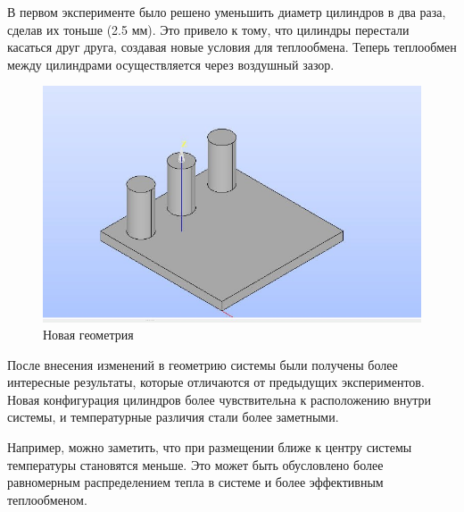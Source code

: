 \documentclass[a4paper,12pt]{article}
\theoremstyle{plain} %
\theoremstyle{definition} %
\theoremstyle{remark} %
\begin{document}
В первом эксперименте было решено уменьшить диаметр цилиндров в два раза, сделав их тоньше (2.5 мм). Это привело к тому, что цилиндры перестали касаться друг друга, создавая новые условия для теплообмена. Теперь теплообмен между цилиндрами осуществляется через воздушный зазор.

\begin{figure}[h]
	\begin{center}
		\includegraphics[width=0.4\linewidth]{images/20.jpg}
		\caption{Новая геометрия} %
	\end{center}
\end{figure}

После внесения изменений в геометрию системы были получены более интересные результаты, которые отличаются от предыдущих экспериментов. Новая конфигурация цилиндров более чувствительна к расположению внутри системы, и температурные различия стали более заметными.

Например, можно заметить, что при размещении ближе к центру системы температуры становятся меньше. Это может быть обусловлено более равномерным распределением тепла в системе и более эффективным теплообменом.
\end{document}
